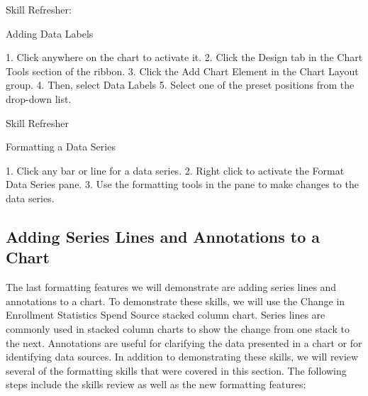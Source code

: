 Skill Refresher:


Adding Data Labels

1. Click anywhere on the chart to activate it.
2. Click the Design tab in the Chart Tools section of the ribbon.
3. Click the Add Chart Element in the Chart Layout group.
4. Then, select Data Labels
5. Select one of the preset positions from the drop-down list.





Skill Refresher


Formatting a Data Series

1. Click any bar or line for a data series.
2. Right click to activate the Format Data Series pane.
3. Use the formatting tools in the pane to make changes to the data series.



\subsection{Adding Series Lines and Annotations to a Chart}

The last formatting features we will demonstrate are adding series lines and annotations to a chart.
To demonstrate these skills, we will use the Change in Enrollment Statistics Spend Source stacked
column chart. Series lines are commonly used in stacked column charts to show the change from one
stack to the next. Annotations are useful for clarifying the data presented in a chart or for identifying
data sources. In addition to demonstrating these skills, we will review several of the formatting skills
that were covered in this section. The following steps include the skills review as well as the new
formatting features:

